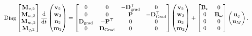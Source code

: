 \documentclass[11pt,a4paper]{article}
\DeclareMathOperator*{\grad}{grad}
\DeclareMathOperator*{\Grad}{Grad}
\begin{document}
\begin{equation}\label{eq:discrete_free_mindlin}
\mathrm{Diag}
\begin{bmatrix}
\mathbf{M}_{v, 2} \\
\mathbf{M}_{w, 2} \\
\mathbf{M}_{m, 2} \\
\mathbf{M}_{q, 2} \\
\end{bmatrix}
    \odv{}{t}
    \begin{pmatrix}
        \mathbf{v}_2 \\
        \mathbf{w}_2 \\
        \mathbf{n}_2 \\
        \mathbf{m}_2
    \end{pmatrix} = 
    \begin{bmatrix}
        0 & 0 & -\mathbf{D}_{\grad}^\top & 0 \\
        0 & 0 & \mathbf{P} & -\mathbf{D}_{\Grad}^\top \\
        \mathbf{D}_{\grad} & -\mathbf{P}^\top & 0 & 0 \\
        0 & \mathbf{D}_{\Grad} & 0 & 0
    \end{bmatrix}
    \begin{pmatrix}
        \mathbf{v}_2 \\
        \mathbf{w}_2 \\
        \mathbf{n}_2 \\
        \mathbf{m}_2
    \end{pmatrix} + \begin{bmatrix}
        \mathbf{B}_{v} & 0 \\
        0 & \mathbf{B}_{\bm\omega} \\
        0 & 0 \\
        0 & 0 \\
    \end{bmatrix}\begin{pmatrix}
        \mathbf{u}_q \\
        \mathbf{u}_M
    \end{pmatrix}.
\end{equation}
\end{document}

